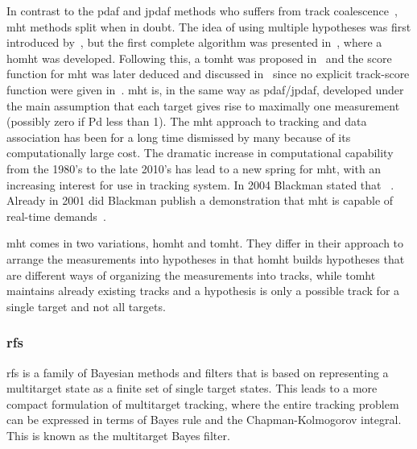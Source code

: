 In contrast to the \gls{pdaf} and \gls{jpdaf} methods who suffers from track \gls{coalescence}~\cite{Fitzgerald1986,Blom2000}, \gls{mht} methods split when in doubt. The idea of using multiple hypotheses was first introduced by~\cite{Singer1974}, but the first complete algorithm was presented in~\cite{Reid1979}, where a \gls{homht} was developed. Following this, a \gls{tomht} was proposed in~\cite{Kurien1990} and the \gls{score} function for \gls{mht} was later deduced and discussed in~\cite{Bar-Shalom2007} since no explicit track-score function were given in~\cite{Kurien1990}. \gls{mht} is, in the same way as \gls{pdaf}/\gls{jpdaf}, developed under the main assumption that each target gives rise to maximally one \gls{measurement} (possibly zero if \gls{Pd} less than 1). The \gls{mht} approach to tracking and data association has been for a long time dismissed by many because of its computationally large cost. The dramatic increase in computational capability from the 1980's to the late 2010's has lead to a new spring for \gls{mht}, with an increasing interest for use in tracking system. In 2004 Blackman stated that ~\cite{Blackman2004}. Already in 2001 did Blackman publish a demonstration that \gls{mht} is capable of real-time demands~\cite{Blackman2001}.

\gls{mht} comes in two variations, \gls{homht} and \gls{tomht}. They differ in their approach to arrange the measurements into hypotheses in that \gls{homht} builds hypotheses that are different ways of organizing the measurements into tracks, while \gls{tomht} maintains already existing tracks and a hypothesis is only a possible track for a single target and not all targets.


\subsubsection{\gls{rfs}}
\Gls{rfs} is a family of Bayesian methods and filters that is based on representing a multitarget state as a finite set of single target states. 
This leads to a more compact formulation of multitarget tracking, where the entire tracking problem can be expressed in terms of Bayes rule and the Chapman-Kolmogorov integral. This is known as the multitarget Bayes filter. 

